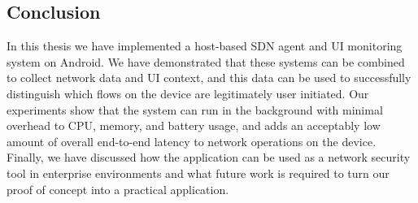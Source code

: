 \subsection{Conclusion}
\label{sec:conclusion}

In this thesis we have implemented a host-based SDN agent and UI monitoring
system on Android. We have demonstrated that these systems can be combined to
collect network data and UI context, and this data can be used to successfully
distinguish which flows on the device are legitimately user initiated. Our
experiments show that the system can run in the background with minimal overhead
to CPU, memory, and battery usage, and adds an acceptably low amount of overall
end-to-end latency to network operations on the device. Finally, we have
discussed how the application can be used as a network security tool in
enterprise environments and what future work is required to turn our proof of
concept into a practical application.

\newpage

